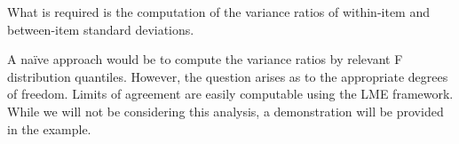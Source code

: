 \documentclass[12pt, a4paper]{report}
\theoremstyle{plain}
\theoremstyle{definition}
\theoremstyle{remark}
\begin{document}
What is required is the computation of the variance ratios of within-item and between-item standard deviations.  

A naïve approach would be to compute the variance ratios by relevant F distribution quantiles. However, the question arises as to the appropriate degrees of freedom.
Limits of agreement are easily computable using the LME framework. While we will not be considering this analysis, a demonstration will be provided in the example.






%
%
%
%
%
%
%



\end{document}
